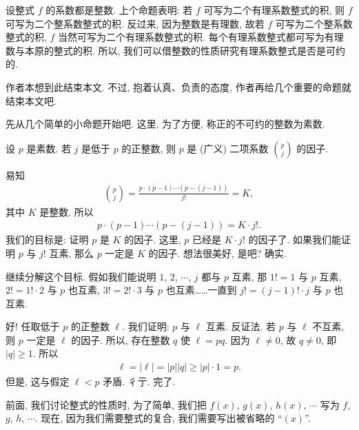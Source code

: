 \begin{remark}
    设整式 $f$ 的系数都是整数. 上个命题表明: 若 $f$ 可写为二个有理系数整式的积, 则 $f$ 可写为二个整系数整式的积. 反过来, 因为整数是有理数, 故若 $f$ 可写为二个整系数整式的积, $f$ 当然可写为二个有理系数整式的积. 每个有理系数整式都可写为有理数与本原的整式的积. 所以, 我们可以借整数的性质研究有理系数整式是否是可约的.
\end{remark}

\myLine

作者本想到此结束本文. 不过, 抱着认真、负责的态度, 作者再给几个重要的命题就结束本文吧.

先从几个简单的小命题开始吧. 这里, 为了方便, 称正的不可约的整数为素数.

\begin{proposition}
    设 $p$ 是素数. 若 $j$ 是低于 $p$ 的正整数, 则 $p$ 是 (广义) 二项系数 $\binom{p}{j}$ 的因子.
\end{proposition}

\begin{pf}
    易知
    \begin{align*}
        \binom{p}{j} = \frac{p \cdot (p-1) \cdots (p-(j-1))}{j!} = K,
    \end{align*}
    其中 $K$ 是整数. 所以
    \begin{align*}
        p \cdot (p-1) \cdots (p-(j-1)) = K \cdot j!.
    \end{align*}
    我们的目标是: 证明 $p$ 是 $K$ 的因子. 这里, $p$ 已经是 $K \cdot j!$ 的因子了. 如果我们能证明 $p$ 与 $j!$ 互素, 那么 $p$ 一定是 $K$ 的因子. 想法很美好, 是吧? 确实.

    继续分解这个目标. 假如我们能说明 $1$, $2$, $\cdots$, $j$ 都与 $p$ 互素, 那 $1! = 1$ 与 $p$ 互素, $2! = 1! \cdot 2$ 与 $p$ 也互素, $3! = 2! \cdot 3$ 与 $p$ 也互素……一直到 $j! = (j-1)! \cdot j$ 与 $p$ 也互素.

    好! 任取低于 $p$ 的正整数 $\ell$. 我们证明: $p$ 与 $\ell$ 互素. 反证法. 若 $p$ 与 $\ell$ 不互素, 则 $p$ 一定是 $\ell$ 的因子. 所以, 存在整数 $q$ 使 $\ell = pq$. 因为 $\ell \neq 0$, 故 $q \neq 0$, 即 $|q| \geq 1$. 所以
    \begin{align*}
        \ell = |\ell| = |p| |q| \geq |p| \cdot 1 = p.
    \end{align*}
    但是, 这与假定 $\ell < p$ 矛盾. 彳亍. 完了.
\end{pf}

前面, 我们讨论整式的性质时, 为了简单, 我们把 $f(x)$, $g(x)$, $h(x)$, $\cdots$ 写为 $f$, $g$, $h$, $\cdots$. 现在, 因为我们需要整式的复合, 我们需要写出被省略的 ``$(x)$''.

